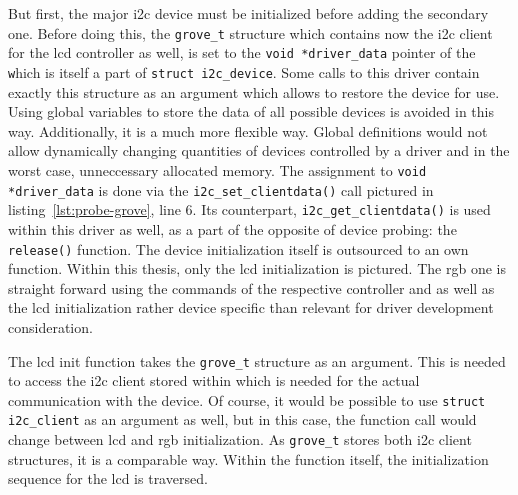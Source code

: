 But first, the major \ac{i2c} device must be initialized before adding the secondary one.
Before doing this, the \texttt{grove_t} structure which contains now the \ac{i2c} client for the \ac{lcd} controller as well, is set to the \texttt{void *driver_data} pointer of the \texttt which is itself a part of \texttt{struct i2c_device}.
Some calls to this driver contain exactly this structure as an argument which allows to restore the device for use.
Using global variables to store the data of all possible devices is avoided in this way.
Additionally, it is a much more flexible way.
Global definitions would not allow dynamically changing quantities of devices controlled by a driver and in the worst case, unneccessary allocated memory.
The assignment to \texttt{void *driver_data} is done via the \texttt{i2c_set_clientdata()} call pictured in listing~\ref{lst:probe-grove}, line 6.
Its counterpart, \texttt{i2c_get_clientdata()} is used within this driver as well, as a part of the opposite of device probing: the \texttt{release()} function. 
The device initialization itself is outsourced to an own function.
Within this thesis, only the \ac{lcd} initialization is pictured.
The \ac{rgb} one is straight forward using the commands of the respective controller and as well as the \ac{lcd} initialization rather device specific than relevant for driver development consideration.

The \ac{lcd} init function takes the \texttt{grove_t} structure as an argument.
This is needed to access the \ac{i2c} client stored within which is needed for the actual communication with the device.
Of course, it would be possible to use \texttt{struct i2c_client} as an argument as well, but in this case, the function call would change between \ac{lcd} and \ac{rgb} initialization.
As \texttt{grove_t} stores both \ac{i2c} client structures, it is a comparable way.
Within the function itself, the initialization sequence for the \ac{lcd} is traversed.

